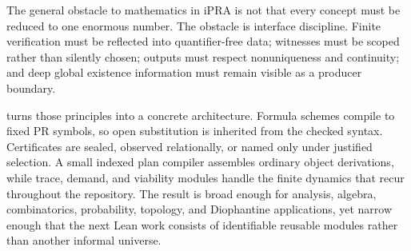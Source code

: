 The general obstacle to mathematics in iPRA is not that every concept must be
reduced to one enormous number.  The obstacle is interface discipline.  Finite
verification must be reflected into quantifier-free data; witnesses must be
scoped rather than silently chosen; outputs must respect nonuniqueness and
continuity; and deep global existence information must remain visible as a
producer boundary.

\Scope turns those principles into a concrete architecture.  Formula schemes
compile to fixed PR symbols, so open substitution is inherited from the
checked syntax.  Certificates are sealed, observed relationally, or named only
under justified selection.  A small indexed plan compiler assembles ordinary
object derivations, while trace, demand, and viability modules handle the
finite dynamics that recur throughout the repository.  The result is broad
enough for analysis, algebra, combinatorics, probability, topology, and
Diophantine applications, yet narrow enough that the next Lean work consists
of identifiable reusable modules rather than another informal universe.
